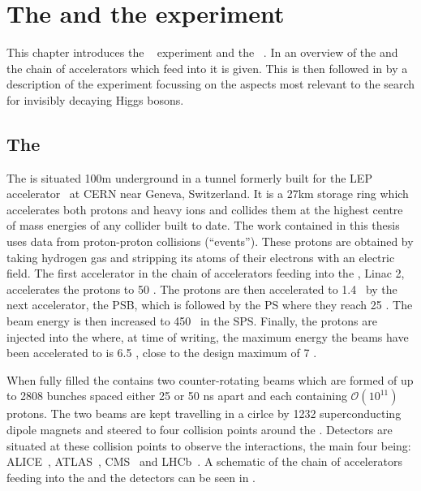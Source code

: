 \chapter{The \LHC and the \CMS experiment}
\label{chap:detector}

This chapter introduces the \CMS~\cite{Chatrchyan:2008aa} experiment and the \LHC~\cite{1748-0221-3-08-S08001}. In  an overview of the \LHC and the chain of accelerators which feed into it is given. This is then followed in  by a description of the \CMS experiment focussing on the aspects most relevant to the search for invisibly decaying Higgs bosons.

\section{The \LHC}
\label{sec:lhc}
The \LHC is situated 100m underground in a tunnel formerly built for the LEP accelerator~\cite{lepdesign} at CERN near Geneva, Switzerland. It is a 27km storage ring which accelerates both protons and heavy ions and collides them at the highest centre of mass energies of any collider built to date. The work contained in this thesis uses data from proton-proton collisions (``events''). These protons are obtained by taking hydrogen gas and stripping its atoms of their electrons with an electric field. The first accelerator in the chain of accelerators feeding into the \LHC, Linac 2, accelerates the protons to 50 \MeV. The protons are then accelerated to 1.4 \GeV~by the next accelerator, the \ac{PSB}, which is followed by the \ac{PS} where they reach 25 \GeV. The beam energy is then increased to 450 \GeV~in the \ac{SPS}. Finally, the protons are injected into the \LHC where, at time of writing, the maximum energy the beams have been accelerated to is 6.5 \TeV, close to the design maximum of 7 \TeV.

When fully filled the \LHC contains two counter-rotating beams which are formed of up to 2808 bunches spaced either 25 or 50 ns apart and each containing $\mathcal{O}(10^{11})$ protons. The two beams are kept travelling in a cirlce by 1232 superconducting dipole magnets and steered to four collision points around the \LHC. Detectors are situated at these collision points to observe the interactions, the main four being: ALICE~\cite{Aamodt:2008zz}, ATLAS~\cite{Aad:1129811}, CMS~\cite{Chatrchyan:2008aa} and LHCb~\cite{Alves:2008zz}. A schematic of the chain of accelerators feeding into the \LHC and the \LHC detectors can be seen in .

